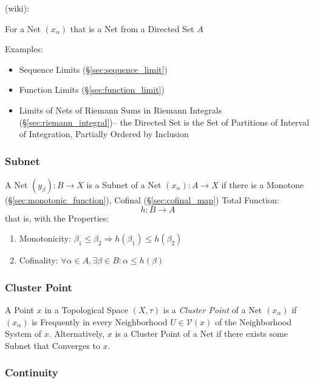(wiki):

For a Net $(x_\alpha)$ that is a Net from a Directed Set $A$

Examples:

\begin{itemize}
  \item Sequence Limits (\S\ref{sec:sequence_limit})
  \item Function Limits (\S\ref{sec:function_limit})
  \item Limits of Nets of Riemann Sums in Riemann Integrals
    (\S\ref{sec:riemann_integral})-- the Directed Set is the Set of Partitions
    of Interval of Integration, Partially Ordered by Inclusion
\end{itemize}



\subsubsection{Subnet}\label{sec:subnet}

A Net $(y_\beta) : B \rightarrow X$ is a Subnet of a Net $(x_\alpha) :
A \rightarrow X$ if there is a Monotone
(\S\ref{sec:monotonic_function}), Cofinal (\S\ref{sec:cofinal_map})
Total Function:
\[
  h : B \rightarrow A
\]
that is, with the Properties:
\begin{enumerate}
  \item Monotonicity:
  $\beta_1 \leq \beta_2 \Rightarrow h(\beta_1) \leq h(\beta_2)$
  \item Cofinality:
   $\forall \alpha \in A, \exists \beta \in B : \alpha \leq h(\beta)$
\end{enumerate}



\subsubsection{Cluster Point}\label{sec:cluster_point}

A Point $x$ in a Topological Space $(X,\tau)$ is a \emph{Cluster
  Point} of a Net $(x_\alpha)$ if $(x_\alpha)$ is Frequently in every
Neighborhood $U \in \mathcal{V}(x)$ of the Neighborhood System of $x$.
Alternatively, $x$ is a Cluster Point of a Net if there exists some
Subnet that Converges to $x$.



\subsubsection{Continuity}\label{sec:net_continuity}

